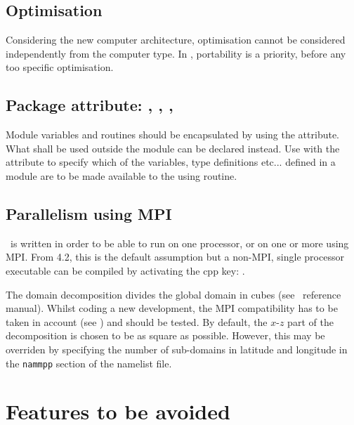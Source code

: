 \subsection{Optimisation}

Considering the new computer architecture, optimisation cannot be considered independently
from the computer type.  In \NEMO, portability is a priority, before any too specific
optimisation.

\subsection{Package attribute: , , , }

Module variables and routines should be encapsulated by using the  attribute.
What shall be used outside the module can be declared  instead.
Use  with the  attribute to specify which of the variables, type definitions etc...
defined in a module are to be made available to the using routine.

\subsection{Parallelism using MPI}

\NEMO\ is written in order to be able to run on one processor, or on one or more using MPI.
From 4.2, this is the default assumption but a non-MPI, single processor executable can be
compiled by activating the cpp key: .  

The domain decomposition divides the global domain in cubes (see \NEMO\ reference manual).
Whilst coding a new development, the MPI compatibility has to be taken in account (see
) and should be tested.  By default, the $x$-$z$ part of the
decomposition is chosen to be as square as possible.  However, this may be overriden by
specifying the number of sub-domains in latitude and longitude in the \texttt{nammpp}
section of the namelist file.

\section{Features to be avoided}

